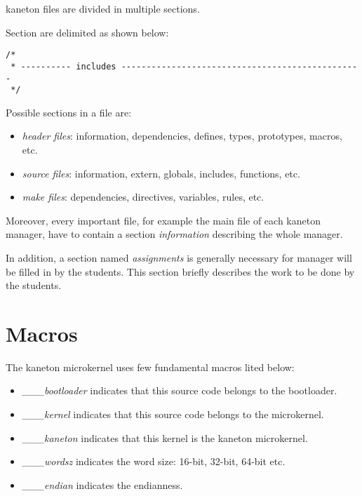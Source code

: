 kaneton files are divided in multiple sections.

Section are delimited as shown below:

\begin{verbatim}
/*
 * ---------- includes ------------------------------------------------
 */
\end{verbatim}

Possible sections in a file are:

\begin{itemize}
  \item
    \textit{header files}: information, dependencies, defines, types,
    prototypes, macros, etc.
  \item
    \textit{source files}: information, extern, globals, includes,
    functions, etc.
  \item
    \textit{make files}: dependencies, directives, variables, rules, etc.
\end{itemize}

Moreover, every important file, for example the main file of each
kaneton manager, have to contain a section \textit{information} describing
the whole manager.

In addition, a section named \textit{assignments} is generally necessary
for manager will be filled in by the students. This section briefly describes
the work to be done by the students.

%
%

\section{Macros}

The kaneton microkernel uses few fundamental macros lited below:

\begin{itemize}
  \item
    \textit{\_\_\_bootloader} indicates that this source code belongs to
    the bootloader.
  \item
    \textit{\_\_\_kernel} indicates that this source code belongs to the
    microkernel.
  \item
    \textit{\_\_\_kaneton} indicates that this kernel is the kaneton
    microkernel.
  \item
    \textit{\_\_\_wordsz} indicates the word size: 16-bit, 32-bit,
    64-bit etc.
  \item
    \textit{\_\_\_endian} indicates the endianness.
\end{itemize}
